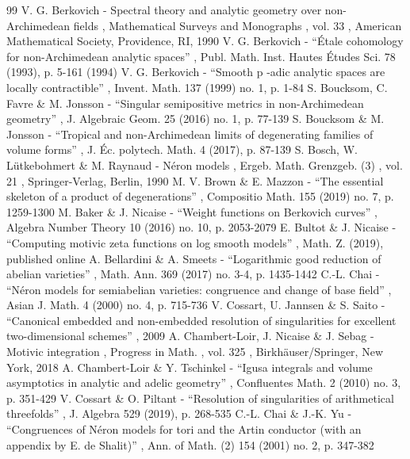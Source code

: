 \documentclass[11pt]{article}
\theoremstyle{definition}
\numberwithin{equation}{subsection}
\begin{document}

\begin{thebibliography}{99}
 V. G. Berkovich - Spectral theory and analytic geometry over non-Archimedean fields , Mathematical Surveys and Monographs , vol. 33 , American Mathematical Society, Providence, RI, 1990
 V. G. Berkovich - “Étale cohomology for non-Archimedean analytic spaces” , Publ. Math. Inst. Hautes Études Sci. 78 (1993), p. 5-161 (1994)
 V. G. Berkovich - “Smooth p -adic analytic spaces are locally contractible” , Invent. Math. 137 (1999) no. 1, p. 1-84
 S. Boucksom, C. Favre \& M. Jonsson - “Singular semipositive metrics in non-Archimedean geometry” , J. Algebraic Geom. 25 (2016) no. 1, p. 77-139
 S. Boucksom \& M. Jonsson - “Tropical and non-Archimedean limits of degenerating families of volume forms” , J. Éc. polytech. Math. 4 (2017), p. 87-139
 S. Bosch, W. Lütkebohmert \& M. Raynaud - Néron models , Ergeb. Math. Grenzgeb. (3) , vol. 21 , Springer-Verlag, Berlin, 1990
 M. V. Brown \& E. Mazzon - “The essential skeleton of a product of degenerations” , Compositio Math. 155 (2019) no. 7, p. 1259-1300
 M. Baker \& J. Nicaise - “Weight functions on Berkovich curves” , Algebra Number Theory 10 (2016) no. 10, p. 2053-2079
 E. Bultot \& J. Nicaise - “Computing motivic zeta functions on log smooth models” , Math. Z. (2019), published online
 A. Bellardini \& A. Smeets - “Logarithmic good reduction of abelian varieties” , Math. Ann. 369 (2017) no. 3-4, p. 1435-1442
 C.-L. Chai - “Néron models for semiabelian varieties: congruence and change of base field” , Asian J. Math. 4 (2000) no. 4, p. 715-736
 V. Cossart, U. Jannsen \& S. Saito - “Canonical embedded and non-embedded resolution of singularities for excellent two-dimensional schemes” , 2009
 A. Chambert-Loir, J. Nicaise \& J. Sebag - Motivic integration , Progress in Math. , vol. 325 , Birkhäuser/Springer, New York, 2018
 A. Chambert-Loir \& Y. Tschinkel - “Igusa integrals and volume asymptotics in analytic and adelic geometry” , Confluentes Math. 2 (2010) no. 3, p. 351-429
 V. Cossart \& O. Piltant - “Resolution of singularities of arithmetical threefolds” , J. Algebra 529 (2019), p. 268-535
 C.-L. Chai \& J.-K. Yu - “Congruences of Néron models for tori and the Artin conductor (with an appendix by E. de Shalit)” , Ann. of Math. (2) 154 (2001) no. 2, p. 347-382

\end{thebibliography}
\end{document}
